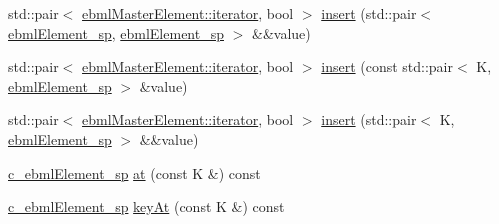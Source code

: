 \begin{DoxyCompactItemize}
\item 
std\+::pair$<$ \mbox{\hyperlink{classebml_1_1ebmlMasterElement_1_1iterator}{ebml\+Master\+Element\+::iterator}}, bool $>$ \mbox{\hyperlink{classebml_1_1ebmlMap_add662463f1a41aec4fa22827ac1b7e7a}{insert}} (std\+::pair$<$ \mbox{\hyperlink{namespaceebml_adad533b7705a16bb360fe56380c5e7be}{ebml\+Element\+\_\+sp}}, \mbox{\hyperlink{namespaceebml_adad533b7705a16bb360fe56380c5e7be}{ebml\+Element\+\_\+sp}} $>$ \&\&value)
\item 
std\+::pair$<$ \mbox{\hyperlink{classebml_1_1ebmlMasterElement_1_1iterator}{ebml\+Master\+Element\+::iterator}}, bool $>$ \mbox{\hyperlink{classebml_1_1ebmlMap_a9edbbe7cc8bf2eb2f5a73adaac8ce624}{insert}} (const std\+::pair$<$ K, \mbox{\hyperlink{namespaceebml_adad533b7705a16bb360fe56380c5e7be}{ebml\+Element\+\_\+sp}} $>$ \&value)
\item 
std\+::pair$<$ \mbox{\hyperlink{classebml_1_1ebmlMasterElement_1_1iterator}{ebml\+Master\+Element\+::iterator}}, bool $>$ \mbox{\hyperlink{classebml_1_1ebmlMap_a34252351567bad0ac7b844ee7e51095b}{insert}} (std\+::pair$<$ K, \mbox{\hyperlink{namespaceebml_adad533b7705a16bb360fe56380c5e7be}{ebml\+Element\+\_\+sp}} $>$ \&\&value)
\item 
\mbox{\hyperlink{namespaceebml_a2deef4e8071531b32e3533f1bf978917}{c\+\_\+ebml\+Element\+\_\+sp}} \mbox{\hyperlink{classebml_1_1ebmlMap_a509ec9c5ff36ce6b448f475267b6269e}{at}} (const K \&) const
\item 
\mbox{\hyperlink{namespaceebml_a2deef4e8071531b32e3533f1bf978917}{c\+\_\+ebml\+Element\+\_\+sp}} \mbox{\hyperlink{classebml_1_1ebmlMap_afabb04ac79f0daaf31be77832313a7bc}{key\+At}} (const K \&) const
\end{DoxyCompactItemize}
